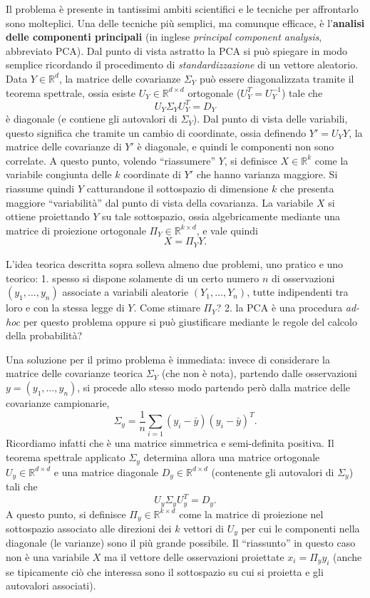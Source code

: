 \documentclass[
  italian,
  letterpaper,
]{book}
\newcommand{\R}{\mathbb{R}}
\theoremstyle{definition}
\theoremstyle{remark}
\begin{document}
Il problema è presente in tantissimi ambiti scientifici e le tecniche
per affrontarlo sono molteplici. Una delle tecniche più semplici, ma
comunque efficace, è l'\textbf{analisi delle componenti principali} (in
inglese \emph{principal component analysis}, abbreviato PCA). Dal punto
di vista astratto la PCA si può spiegare in modo semplice ricordando il
procedimento di \emph{standardizzazione} di un vettore aleatorio. Data
\(Y \in \R^d\), la matrice delle covarianze \(\Sigma_Y\) può essere
diagonalizzata tramite il teorema spettrale, ossia esiste
\(U_Y \in \R^{d\times d}\) ortogonale (\(U^T_Y = U^{-1}_Y\)) tale che
\[ U_Y \Sigma_Y U^T_Y = D_Y\] è diagonale (e contiene gli autovalori di
\(\Sigma_Y\)). Dal punto di vista delle variabili, questo significa che
tramite un cambio di coordinate, ossia definendo \(Y' = U_Y Y\), la
matrice delle covarianze di \(Y'\) è diagonale, e quindi le componenti
non sono correlate. A questo punto, volendo ``riassumere'' \(Y\), si
definisce \(X \in \R^k\) come la variabile congiunta delle \(k\)
coordinate di \(Y'\) che hanno varianza maggiore. Si riassume quindi
\(Y\) catturandone il sottospazio di dimensione \(k\) che presenta
maggiore ``variabilità'' dal punto di vista della covarianza. La
variabile \(X\) si ottiene proiettando \(Y\) su tale sottospazio, ossia
algebricamente mediante una matrice di proiezione ortogonale
\(\Pi_Y \in \R^{k \times d}\), e vale quindi \[ X = \Pi_Y Y.\]

L'idea teorica descritta sopra solleva almeno due problemi, uno pratico
e uno teorico: 1. spesso si dispone solamente di un certo numero \(n\)
di osservazioni \((y_1, \ldots, y_n)\) associate a variabili aleatorie
\((Y_1, \ldots, Y_n)\), tutte indipendenti tra loro e con la stessa
legge di \(Y\). Come stimare \(\Pi_Y\)? 2. la PCA è una procedura
\emph{ad-hoc} per questo problema oppure si può giustificare mediante le
regole del calcolo della probabilità?

Una soluzione per il primo problema è immediata: invece di considerare
la matrice delle covarianze teorica \(\Sigma_Y\) (che non è nota),
partendo dalle osservazioni \(y = (y_1, \ldots, y_n)\), si procede allo
stesso modo partendo però dalla matrice delle covarianze campionarie,
\[\Sigma_{y} = \frac 1 n \sum_{i=1}(y_i-\bar{y})(y_i-\bar{y})^T.\]
Ricordiamo infatti che è una matrice simmetrica e semi-definita
positiva. Il teorema spettrale applicato \(\Sigma_y\) determina allora
una matrice ortogonale \(U_y \in \R^{d\times d}\) e una matrice
diagonale \(D_y \in \R^{d\times d}\) (contenente gli autovalori di
\(\Sigma_y\)) tali che \[ U_y \Sigma_y U_y^T = D_y.\] A questo punto, si
definisce \(\Pi_y \in \R^{k \times d}\) come la matrice di proiezione
nel sottospazio associato alle direzioni dei \(k\) vettori di \(U_y\)
per cui le componenti nella diagonale (le varianze) sono il più grande
possibile. Il ``riassunto'' in questo caso non è una variabile \(X\) ma
il vettore delle osservazioni proiettate \(x_i = \Pi_y y_i\) (anche se
tipicamente ciò che interessa sono il sottospazio su cui si proietta e
gli autovalori associati).
\end{document}
